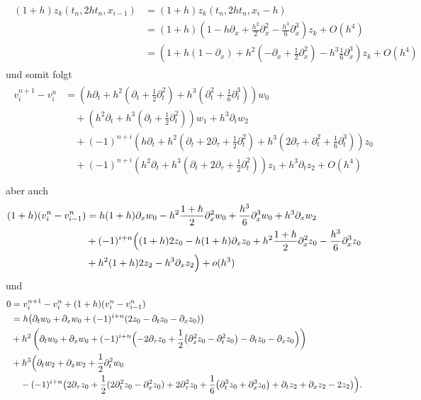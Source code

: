 {\small
\begin{align}
\begin{split}
(1 + h) z_k(t_n, 2 h t_n, x_{i-1}) &= (1+h) z_k(t_n, 2 h t_n, x_i - h)\\
&= (1 + h) \left( 1 - h \partial_x + \frac{h^2}{2} \partial^2_x - \frac {h^3}{6} \partial^3_x \right) z_k + O(h^4)\\
&= \left( 1 + h( 1 - \partial_x ) + h^2  \left( -\partial_x + \frac{1}{2} \partial^2_x \right) - h^3 \frac{1}{6} \partial^3_x \right) z_k + O(h^4)
\end{split}
\end{align}
}
und somit folgt
\begin{align}
\begin{split}
v^{n+1}_i - v^n_i &= \left(h \partial_t + h^2 \left( \partial_t + \frac{1}{2} \partial^2_t \right) + h^3 \left( \partial^2_t + \frac{1}{6} \partial^3_t \right) \right) w_0\\
&\quad + \left(h^2 \partial_t + h^3 \left( \partial_t + \frac{1}{2} \partial^2_t \right) \right) w_1 + h^3 \partial_t w_2\\
&\quad + (-1)^{n+i} \left(h \partial_t + h^2 \left( \partial_t + 2 \partial_\tau + \frac{1}{2} \partial^2_t \right) + h^3 \left( 2 \partial_\tau + \partial^2_t + \frac{1}{6} \partial^3_t \right) \right) z_0\\
&\quad + (-1)^{n+i} \left(h^2 \partial_t + h^3 \left( \partial_t + 2 \partial_\tau + \frac{1}{2} \partial^2_t \right)\right) z_1 + h^3 \partial_t z_2 + O(h^4)\\
\end{split}
\end{align}
aber auch
\begin{align}
\begin{split}
(1 + h) (v^n_i - v^n_{i-1}) &= h (1 + h) \partial_x w_0 - h^2 \frac{1 + h}{2} \partial^2_x w_0 + \frac{h^3}{6} \partial^3_x w_0+ h^3 \partial_x w_2\\
&+ (-1)^{i+n} \Bigl( (1+h)2z_0 - h(1+h) \partial_x z_0 + h^2 \frac{1+h}{2} \partial^2_x z_0 - \frac{h^3}{6} \partial^3_x z_0\\
&+ h^2 (1 + h) 2 z_2 - h^3 \partial_x z_2 \Bigr) + o(h^3)
\end{split}
\end{align}
und
\begin{align*}
0 &= v^{n+1}_i - v^n_i + (1 + h) (v^n_i - v^n_{i-1})\\
&= h \bigl( \partial_t w_0 + \partial_x w_0  + (-1)^{i+n} (2 z_0 - \partial_t z_0 - \partial_x z_0) \bigr)\\
&+ h^2 \left( \partial_t w_0 + \partial_x w_0 + (-1)^{i+n} \Bigl( - 2 \partial_\tau z_0 + \frac{1}{2} \bigl( \partial^2_x z_0 - \partial^2_t z_0 \bigr)  - \partial_t z_0 - \partial_x z_0 \Bigr) \right)\\
&+ h^3 \Bigl( \partial_t w_2 + \partial_x w_2 + \frac{1}{2} \partial^2_t w_0\\
&\quad - (-1)^{i+n} \bigl( 2 \partial_\tau z_0 + \frac{1}{2} (2\partial^2_t z_0 - \partial^2_x z_0) + 2 \partial^2_\tau z_0 + \frac{1}{6} \bigl(\partial^3_t z_0 + \partial^3_x z_0\bigr) + \partial_t z_2  + \partial_x z_2  - 2 z_2\bigr) \Bigr).
\end{align*}
